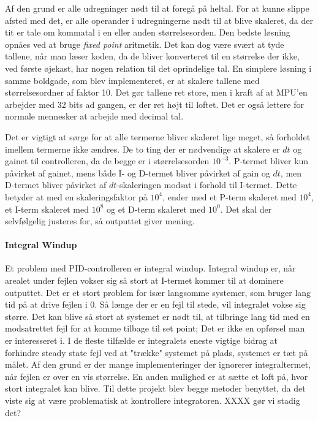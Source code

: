 Af den grund er alle udregninger nødt til at foregå på heltal. For at kunne slippe afsted med det, er alle operander i udregningerne nødt til at blive skaleret, da der tit er tale om kommatal i en eller anden størrelsesorden. Den bedste løsning opnåes ved at bruge \textit{fixed point} aritmetik. Det kan dog være svært at tyde tallene, når man læser koden, da de bliver konverteret til en størrelse der ikke, ved første øjekast, har nogen relation til det oprindelige tal. En simplere løsning i samme boldgade, som blev implementeret, er at skalere tallene med størrelsesordner af faktor 10. Det gør tallene ret store, men i kraft af at MPU'en arbejder med 32 bits ad gangen, er der ret højt til loftet. Det er også lettere for normale mennesker at arbejde med decimal tal.

Det er vigtigt at sørge for at alle termerne bliver skaleret lige meget, så forholdet imellem termerne ikke ændres. De to ting der er nødvendige at skalere er $dt$ og gainet til controlleren, da de begge er i størrelsesorden $10^{-3}$. P-termet bliver kun påvirket af gainet, mens både I- og D-termet bliver påvirket af gain og $dt$, men D-termet bliver påvirket af $dt$-skaleringen modsat i forhold til I-termet. Dette betyder at med en skaleringsfaktor på $10^4$, ender med et P-term skaleret med $10^4$, et I-term skaleret med $10^8$ og et D-term skaleret med $10^0$. Det skal der selvfølgelig justeres for, så outputtet giver mening.

\paragraph{Integral Windup}

Et problem med PID-controlleren er integral windup. Integral windup er, når arealet under fejlen vokser sig så stort at I-termet kommer til at dominere outputtet. Det er et stort problem for især langsomme systemer, som bruger lang tid på at drive fejlen i 0. Så længe der er en fejl til stede, vil integralet vokse sig større. Det kan blive så stort at systemet er nødt til, at tilbringe lang tid med en modsatrettet fejl for at komme tilbage til set point; Det er ikke en opførsel man er interesseret i. I de fleste tilfælde er integralets eneste vigtige bidrag at forhindre steady state fejl ved at "trække" systemet på plads, systemet er tæt på målet. Af den grund er der mange implementeringer der ignorerer integraltermet, når fejlen er over en vis størrelse. En anden mulighed er at sætte et loft på, hvor stort integralet kan blive. Til dette projekt blev begge metoder benyttet, da det viste sig at være problematisk at kontrollere integratoren. XXXX gør vi stadig det?

